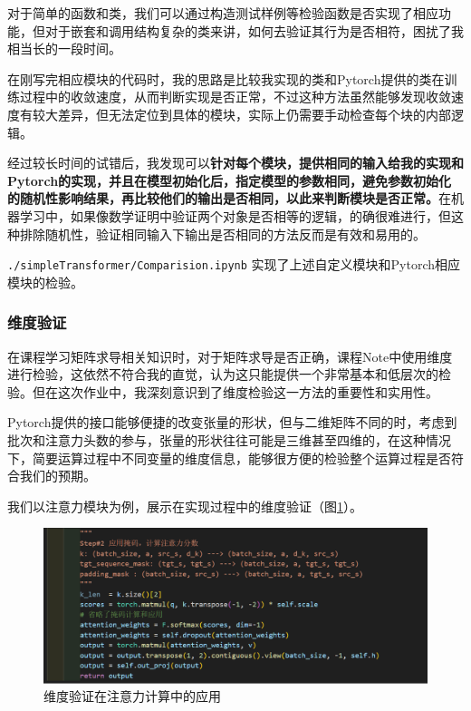 对于简单的函数和类，我们可以通过构造测试样例等检验函数是否实现了相应功能，但对于嵌套和调用结构复杂的类来讲，如何去验证其行为是否相符，困扰了我相当长的一段时间。

在刚写完相应模块的代码时，我的思路是比较我实现的类和Pytorch提供的类在训练过程中的收敛速度，从而判断实现是否正常，不过这种方法虽然能够发现收敛速度有较大差异，但无法定位到具体的模块，实际上仍需要手动检查每个块的内部逻辑。

经过较长时间的试错后，我发现可以\textbf{针对每个模块，提供相同的输入给我的实现和Pytorch的实现，并且在模型初始化后，指定模型的参数相同，避免参数初始化的随机性影响结果，再比较他们的输出是否相同，以此来判断模块是否正常。}在机器学习中，如果像数学证明中验证两个对象是否相等的逻辑，的确很难进行，但这种排除随机性，验证相同输入下输出是否相同的方法反而是有效和易用的。

\texttt{./simpleTransformer/Comparision.ipynb} 实现了上述自定义模块和Pytorch相应模块的检验。

\subsubsection{维度验证}

在课程学习矩阵求导相关知识时，对于矩阵求导是否正确，课程Note中使用维度进行检验，这依然不符合我的直觉，认为这只能提供一个非常基本和低层次的检验。但在这次作业中，我深刻意识到了维度检验这一方法的重要性和实用性。

Pytorch提供的接口能够便捷的改变张量的形状，但与二维矩阵不同的时，考虑到批次和注意力头数的参与，张量的形状往往可能是三维甚至四维的，在这种情况下，简要运算过程中不同变量的维度信息，能够很方便的检验整个运算过程是否符合我们的预期。

我们以注意力模块为例，展示在实现过程中的维度验证（图\ref{fig:simpleT-dimension}）。
\begin{figure}[h]
    \centering
    \includegraphics[width=\linewidth]{img/simpleT/simpleT-dimension.png}
    \caption{维度验证在注意力计算中的应用}
    \label{fig:simpleT-dimension}
\end{figure}

